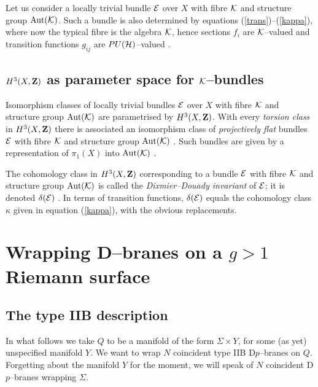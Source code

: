 \documentclass[a4paper,a4paper]{article}
\begin{document}
Let us consider a locally trivial bundle ${\cal  E}$ over $X$ with fibre   
${\cal K}$ and structure group ${\rm Aut}({\cal K})$. Such a bundle is also
determined by equations (\ref{trans})--(\ref{kappa}), where now the typical fibre 
is the algebra ${\cal K}$, hence sections $f_i$ are ${\cal K}$--valued   
and transition functions $g_{ij}$ are  $PU({\cal H})$--valued \cite{BOUWMATHAI}.  
   
\subsection{$H^3(X,{\bf Z})$ as parameter space for 
${\cal K}$--bundles}\label{parameter}  
  
Isomorphism classes of locally trivial bundles ${\cal  E}$ over $X$  
with fibre  ${\cal K}$ and structure group ${\rm Aut}({\cal K})$ are  
parametrised by $H^3(X, {\bf Z})$. With every {\it torsion class} in 
$H^3(X,{\bf Z})$ there is associated an isomorphism class of 
{\it projectively flat} bundles ${\cal E}$ with fibre ${\cal K}$ 
and structure group ${\rm Aut} ({\cal K})$ \cite{BOUWMATHAI}. 
Such bundles are given by a representation of $\pi_1(X)$ into 
${\rm Aut}({\cal K})$ \cite{KOBAYASHI}.   
  
The cohomology class in $H^3(X,{\bf Z})$ corresponding to a bundle 
${\cal  E}$ with fibre ${\cal K}$ and structure group ${\rm Aut}({\cal K})$  
is called the {\it Dixmier--Douady invariant} of ${\cal  E}$; it is denoted  
$\delta({\cal  E})$ \cite{DIXMIER}. In terms of transition functions,  
$\delta({\cal E})$ equals the cohomology class $\kappa$ given in equation 
(\ref{kappa}),  with the obvious replacements.  

\section{Wrapping D--branes on a $g>1$ Riemann surface}\label{wrapping} 

\subsection{The type IIB description}\label{braneantibrane}  

In what follows we take $Q$ to be a manifold of the form $\Sigma\times 
Y$, for some (as yet) unspecified manifold $Y$.  We want to wrap $N$ coincident
type IIB  D$p$--branes on $Q$. Forgetting about the manifold $Y$ for the moment, 
we will speak of $N$ coincident D$p$--branes wrapping $\Sigma$.
\end{document}

